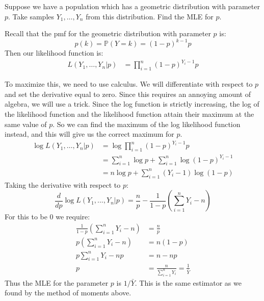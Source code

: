 \documentclass[notes.tex]{subfiles}
\begin{document}
\begin{example}Suppose we have a population which has a geometric distribution with parameter $p$. Take samples $Y_1, \dots, Y_n$ from this distribution. Find the MLE for $p$.

Recall that the pmf for the geometric distribution with parameter $p$ is:
\[
p(k) = \mathbb{P}(Y = k) = (1 - p)^{k-1} p
\]
Then our likelihood function is:
\begin{align*}
L(Y_1, \dots, Y_n | p) &= \prod_{i = 1}^n (1 - p)^{Y_i-1} p
\end{align*}

To maximize this, we need to use calculus. We will differentiate with respect to $p$ and set the derivative equal to zero. Since this requires an annoying amount of algebra, we will use a trick. Since the log function is strictly increasing, the log of the likelihood function and the likelihood function attain their maximum at the same value of $p$. So we can find the maximum of the log likelihood function instead, and this will give us the correct maximum for $p$.
\begin{align*}
\log L(Y_1, \dots, Y_n | p) &= \log \prod_{i = 1}^n (1 - p)^{Y_i-1} p \\
&= \sum_{i = 1}^n \log p + \sum_{i = 1}^n \log (1 - p)^{Y_i-1} \\
&= n \log p +  \sum_{i = 1}^n (Y_i-1) \log (1 - p)
\end{align*}
Taking the derivative with respect to $p$:
\[
\frac{d}{dp} \log L(Y_1, ..., Y_n | p) = \frac{n}{p} - \frac{1}{1 - p} \left( \sum_{i = 1}^n Y_i - n \right)
\]
For this to be 0 we require:
\begin{align*}
 \frac{1}{1 - p} \left( \sum_{i = 1}^n Y_i - n \right) &= \frac{n}{p} \\
p \left( \sum_{i = 1}^n Y_i - n \right) &= n(1-p) \\
p \sum_{i = 1}^n Y_i - np &= n - np \\
p &= \frac{n}{\sum_{i = 1}^n Y_i } = \frac{1}{\bar{Y}}
\end{align*}
Thus the MLE for the parameter $p$ is $1/\bar{Y}$. This is the same estimator as we found by the method of moments above.

\end{example}
\end{document}
